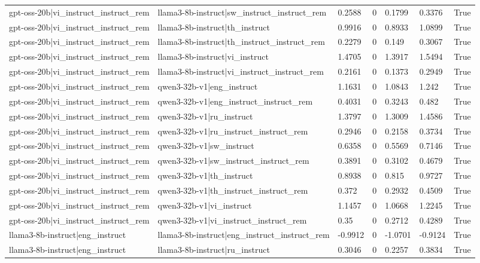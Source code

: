 \begin{table}
\begin{tabular}{llllllr}
gpt-oss-20b|vi_instruct_instruct_rem & llama3-8b-instruct|sw_instruct_instruct_rem & 0.2588 & 0 & 0.1799 & 0.3376 & True \\
gpt-oss-20b|vi_instruct_instruct_rem & llama3-8b-instruct|th_instruct & 0.9916 & 0 & 0.8933 & 1.0899 & True \\
gpt-oss-20b|vi_instruct_instruct_rem & llama3-8b-instruct|th_instruct_instruct_rem & 0.2279 & 0 & 0.149 & 0.3067 & True \\
gpt-oss-20b|vi_instruct_instruct_rem & llama3-8b-instruct|vi_instruct & 1.4705 & 0 & 1.3917 & 1.5494 & True \\
gpt-oss-20b|vi_instruct_instruct_rem & llama3-8b-instruct|vi_instruct_instruct_rem & 0.2161 & 0 & 0.1373 & 0.2949 & True \\
gpt-oss-20b|vi_instruct_instruct_rem & qwen3-32b-v1|eng_instruct & 1.1631 & 0 & 1.0843 & 1.242 & True \\
gpt-oss-20b|vi_instruct_instruct_rem & qwen3-32b-v1|eng_instruct_instruct_rem & 0.4031 & 0 & 0.3243 & 0.482 & True \\
gpt-oss-20b|vi_instruct_instruct_rem & qwen3-32b-v1|ru_instruct & 1.3797 & 0 & 1.3009 & 1.4586 & True \\
gpt-oss-20b|vi_instruct_instruct_rem & qwen3-32b-v1|ru_instruct_instruct_rem & 0.2946 & 0 & 0.2158 & 0.3734 & True \\
gpt-oss-20b|vi_instruct_instruct_rem & qwen3-32b-v1|sw_instruct & 0.6358 & 0 & 0.5569 & 0.7146 & True \\
gpt-oss-20b|vi_instruct_instruct_rem & qwen3-32b-v1|sw_instruct_instruct_rem & 0.3891 & 0 & 0.3102 & 0.4679 & True \\
gpt-oss-20b|vi_instruct_instruct_rem & qwen3-32b-v1|th_instruct & 0.8938 & 0 & 0.815 & 0.9727 & True \\
gpt-oss-20b|vi_instruct_instruct_rem & qwen3-32b-v1|th_instruct_instruct_rem & 0.372 & 0 & 0.2932 & 0.4509 & True \\
gpt-oss-20b|vi_instruct_instruct_rem & qwen3-32b-v1|vi_instruct & 1.1457 & 0 & 1.0668 & 1.2245 & True \\
gpt-oss-20b|vi_instruct_instruct_rem & qwen3-32b-v1|vi_instruct_instruct_rem & 0.35 & 0 & 0.2712 & 0.4289 & True \\
llama3-8b-instruct|eng_instruct & llama3-8b-instruct|eng_instruct_instruct_rem & -0.9912 & 0 & -1.0701 & -0.9124 & True \\
llama3-8b-instruct|eng_instruct & llama3-8b-instruct|ru_instruct & 0.3046 & 0 & 0.2257 & 0.3834 & True \\

\end{tabular}
\end{table}
